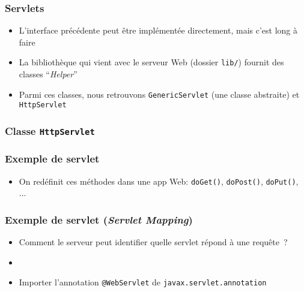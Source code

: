 \documentclass{beamer}
\begin{document}
\begin{frame}
  \frametitle{Servlets}  
  \begin{itemize}
  \item L'interface précédente peut être implémentée directement, mais
    c'est long à faire
  \item La bibliothèque qui vient avec le serveur Web (dossier
    \texttt{lib/}) fournit des classes ``\textit{Helper}''
  \item Parmi ces classes, nous retrouvons \texttt{GenericServlet}
    (une classe abstraite) et \texttt{HttpServlet}
  \end{itemize}
\end{frame}

\begin{frame}
  \frametitle{Classe \texttt{HttpServlet}}
\end{frame}

\begin{frame}
  \frametitle{Exemple de servlet}
  \begin{itemize}
    \vspace{5.5cm}
  \item On redéfinit ces méthodes dans une app Web: \texttt{doGet()},
    \texttt{doPost()}, \texttt{doPut()}, ...
  \end{itemize}
\end{frame}

\begin{frame}
  \frametitle{Exemple de servlet (\textit{Servlet Mapping})}
  \begin{itemize}
    \item Comment le serveur peut identifier quelle servlet répond à une
    requête~?  
    \item[]\vspace{4cm}
	\item Importer l'annotation \texttt{@WebServlet} de \texttt{javax.servlet.annotation}
  \end{itemize}
\end{frame}
\end{document}
